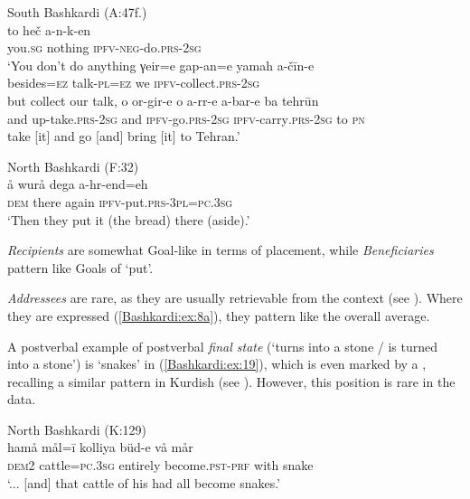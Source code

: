 \documentclass[output=paper,colorlinks,citecolor=brown]{langscibook}
\begin{document}
\ea\label{Bashkardi:ex:17}
South Bashkardi (A:47f.) \\
\ea\label{Bashkardi:ex:17a}
\gll to heč a-n-k-en \\
you\textsc{.sg} nothing \textsc{ipfv-neg-}do\textsc{.prs}\textsc{-2sg}  \\
\glt  `You don't do anything
\ex\label{Bashkardi:ex:17b}
\gll γeir=e gap-an=e yamah a-čīn-e \\
besides\textsc{=ez} talk\textsc{-pl}\textsc{=ez} we \textsc{ipfv-}collect\textsc{.prs}\textsc{-2sg} \\
\glt but collect our talk,
\ex\label{Bashkardi:ex:17c}
\gll o or-gir-e {\hspace{7cm}} o a-rr-e a-bar-e ba tehrūn \\
and up-take\textsc{.prs}\textsc{-2sg} {} and \textsc{ipfv-}go\textsc{.prs}\textsc{-2sg} \textsc{ipfv-}carry\textsc{.prs}\textsc{-2sg} to \textsc{pn} \\
\glt take [it] and go [and] bring [it] to Tehran.'
\z
\z

\ea\label{Bashkardi:ex:18} 
North Bashkardi (F:32) \\
\gll å wurå dega a-hr-end=eh \\
\textsc{dem} there again \textsc{ipfv-}put\textsc{.prs-3pl}\textsc{=pc.3sg} \\
\glt `Then they put it (the bread) there (aside).'
\z

\emph{Recipients} are somewhat Goal-like in terms of placement, while \emph{Beneficiaries} pattern like Goals of `put'.

\emph{Addressees} are rare, as they are usually retrievable from the context (see ). Where they are expressed (\ref{Bashkardi:ex:8a}), they pattern like the overall average.

A postverbal example of postverbal \emph{final state} (`turns into a stone / is turned into a stone') is `snakes' in (\ref{Bashkardi:ex:19}), which is even marked by a , recalling a similar pattern in Kurdish (see \citealt{Haig2022PostPredicateCon}). However, this position is rare in the data.

\ea\label{Bashkardi:ex:19}
North Bashkardi (K:129) \\
\gll hamå mål=ī kolliya büd-e vå mår \\
\textsc{dem2} cattle\textsc{=pc.3sg} entirely become\textsc{.pst-prf} with snake \\
\glt `... [and] that cattle of his had all become snakes.'
\z
\end{document}
